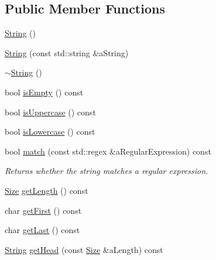 \subsection*{Public Member Functions}
\begin{DoxyCompactItemize}
\item 
\mbox{\hyperlink{classlibrary_1_1core_1_1types_1_1_string_ab49dec039a75f0049c95759141b6d484}{String}} ()
\item 
\mbox{\hyperlink{classlibrary_1_1core_1_1types_1_1_string_a37c737528805786c49eab397ba7b64ae}{String}} (const std\+::string \&a\+String)
\item 
\mbox{\hyperlink{classlibrary_1_1core_1_1types_1_1_string_a97f9b0024a58372a0281b25e2811f3bf}{$\sim$\+String}} ()
\item 
bool \mbox{\hyperlink{classlibrary_1_1core_1_1types_1_1_string_a1981fee5619389b46c786afa7aadc251}{is\+Empty}} () const
\item 
bool \mbox{\hyperlink{classlibrary_1_1core_1_1types_1_1_string_a6d12c373b22a062cfa0270204fc998f5}{is\+Uppercase}} () const
\item 
bool \mbox{\hyperlink{classlibrary_1_1core_1_1types_1_1_string_a3620d335dd5b14029a3a67e75c79be81}{is\+Lowercase}} () const
\item 
bool \mbox{\hyperlink{classlibrary_1_1core_1_1types_1_1_string_abab50e9c0d620b246d0bfde0dad0add5}{match}} (const std\+::regex \&a\+Regular\+Expression) const
\begin{DoxyCompactList}\small\item\em Returns whether the string matches a regular expression. \end{DoxyCompactList}\item 
\mbox{\hyperlink{namespacelibrary_1_1core_1_1types_a701626ea1027888ebbb8cfd0ff7adab0}{Size}} \mbox{\hyperlink{classlibrary_1_1core_1_1types_1_1_string_adc97f82ccc9a3d034bc3127e643199fb}{get\+Length}} () const
\item 
char \mbox{\hyperlink{classlibrary_1_1core_1_1types_1_1_string_ad695264b765448ecf4f8617553012eee}{get\+First}} () const
\item 
char \mbox{\hyperlink{classlibrary_1_1core_1_1types_1_1_string_aae3aaf5e3b3fde3f7b90fd1ee431c9d4}{get\+Last}} () const
\item 
\mbox{\hyperlink{classlibrary_1_1core_1_1types_1_1_string}{String}} \mbox{\hyperlink{classlibrary_1_1core_1_1types_1_1_string_af11475f7a147a11342765a690df18852}{get\+Head}} (const \mbox{\hyperlink{namespacelibrary_1_1core_1_1types_a701626ea1027888ebbb8cfd0ff7adab0}{Size}} \&a\+Length) const

\end{DoxyCompactItemize}
